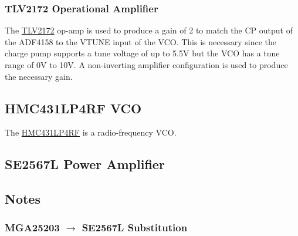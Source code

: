 \subsubsection{TLV2172 Operational Amplifier}
\label{sec:tlv2172-op-amp}

The \href{http://www.ti.com/lit/ds/symlink/tlv172.pdf}{TLV2172} op-amp is used to produce a gain of
2 to match the CP output of the ADF4158 to the VTUNE input of the VCO. This is necessary since the
charge pump supports a tune voltage of up to 5.5V but the VCO has a tune range of 0V to 10V. A
non-inverting amplifier configuration is used to produce the necessary gain.

\subsection{HMC431LP4RF VCO}
\label{sec:hmc431lp4rf}

The
\href{http://www.analog.com/media/en/technical_documentation/data_sheets/hmc431.pdf}{HMC431LP4RF} is
a radio-frequency VCO.

\subsection{SE2567L Power Amplifier}
\label{sec:se2567l-power-amp}


\subsection{Notes}
\label{sec:notes}

\subsubsection{MGA25203 $\rightarrow$ SE2567L Substitution}
\label{sec:mga25203-se2567l-sub}

